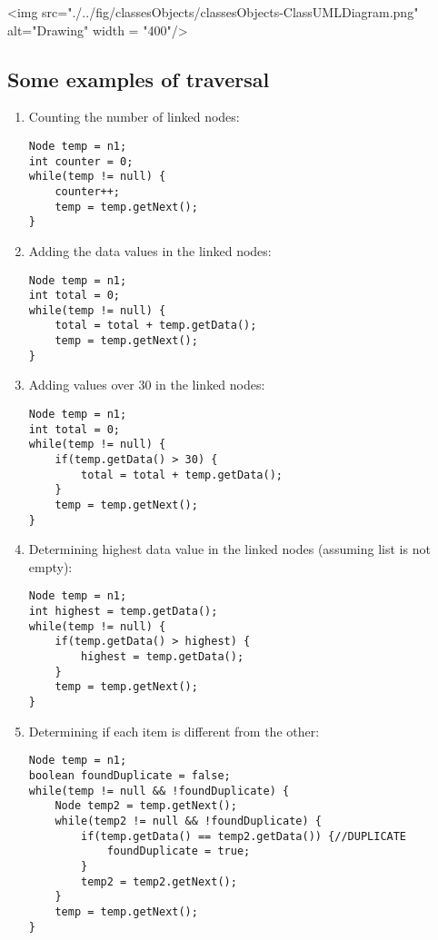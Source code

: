 \vskip 0.5cm
<img src="./../fig/classesObjects/classesObjects-ClassUMLDiagram.png" alt="Drawing" width = "400"/>

\newpage

\subsection{Some examples of traversal}

\begin{enumerate}
\item Counting the number of linked nodes:
\begin{lstlisting}
Node temp = n1;
int counter = 0;
while(temp != null) {
	counter++;
	temp = temp.getNext();
}
\end{lstlisting}

\item Adding the data values in the linked nodes:
\begin{lstlisting}
Node temp = n1;
int total = 0;
while(temp != null) {
	total = total + temp.getData();
	temp = temp.getNext();
}
\end{lstlisting}

\item Adding values over 30 in the linked nodes:
\begin{lstlisting}
Node temp = n1;
int total = 0;
while(temp != null) {
	if(temp.getData() > 30) {
		total = total + temp.getData();
	}
	temp = temp.getNext();
}
\end{lstlisting}

\newpage

\item Determining highest data value in the linked nodes (assuming list is not empty):
\begin{lstlisting}
Node temp = n1;
int highest = temp.getData();
while(temp != null) {
	if(temp.getData() > highest) {
		highest = temp.getData();
	}
	temp = temp.getNext();
}
\end{lstlisting}

\item Determining if each item is different from the other:
\begin{lstlisting}[linewidth=14cm]
Node temp = n1;
boolean foundDuplicate = false; 
while(temp != null && !foundDuplicate) {
	Node temp2 = temp.getNext();
	while(temp2 != null && !foundDuplicate) {
		if(temp.getData() == temp2.getData()) {//DUPLICATE
			foundDuplicate = true; 
		}
		temp2 = temp2.getNext();
	}
	temp = temp.getNext();
}
\end{lstlisting}
\end{enumerate}

